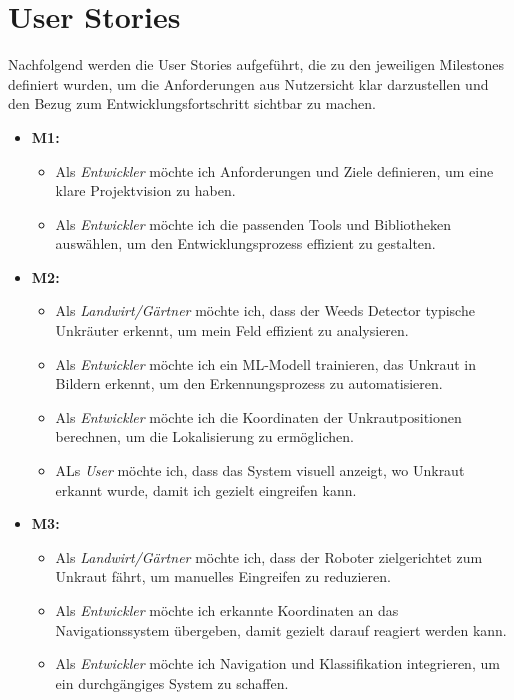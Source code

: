 \documentclass[12pt, a4paper]{scrreprt}
\begin{document}
\section{User Stories}
Nachfolgend werden die User Stories aufgeführt, die zu den jeweiligen Milestones definiert wurden, um die Anforderungen aus Nutzersicht klar darzustellen und den Bezug zum Entwicklungsfortschritt sichtbar zu machen.\\
\begin{itemize}
    \item \textbf{M1:}
    \begin{itemize}
        \item Als \emph{Entwickler} möchte ich Anforderungen und Ziele definieren, um eine klare Projektvision zu haben.
        \item Als \emph{Entwickler} möchte ich die passenden Tools und Bibliotheken auswählen, um den Entwicklungsprozess effizient zu gestalten.
    \end{itemize}
    \item \textbf{M2:}
    \begin{itemize}
        \item Als \emph{Landwirt/Gärtner} möchte ich, dass der Weeds Detector typische Unkräuter erkennt, um mein Feld effizient zu analysieren.
        \item Als \emph{Entwickler} möchte ich ein ML-Modell trainieren, das Unkraut in Bildern erkennt, um den Erkennungsprozess zu automatisieren.
        \item Als \emph{Entwickler} möchte ich die Koordinaten der Unkrautpositionen berechnen, um die Lokalisierung zu ermöglichen.
        \item ALs \emph{User} möchte ich, dass das System visuell anzeigt, wo Unkraut erkannt wurde, damit ich gezielt eingreifen kann.
    \end{itemize}
    \item \textbf{M3:}
    \begin{itemize}
        \item Als \emph{Landwirt/Gärtner} möchte ich, dass der Roboter zielgerichtet zum Unkraut fährt, um manuelles Eingreifen zu reduzieren.
        \item Als \emph{Entwickler} möchte ich erkannte Koordinaten an das Navigationssystem übergeben, damit gezielt darauf reagiert werden kann.
        \item Als \emph{Entwickler} möchte ich Navigation und Klassifikation integrieren, um ein durchgängiges System zu schaffen.
    \end{itemize}

\end{itemize}
\end{document}

